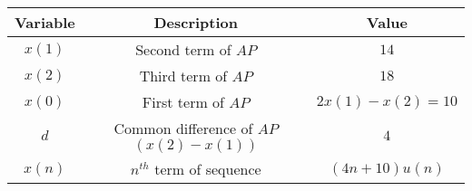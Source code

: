 \begin{tabular}{|c|c|c|} 
      \hline
\textbf{Variable}& \textbf{Description}& \textbf{Value}\\\hline
        $x(1)$& Second term of $AP$ & $14$ \\ \hline
        $x(2)$ &Third term of $AP$ & $18$ \\ \hline
         $x(0)$ & First term of $AP$ & $2x(1)-x(2)=10$ \\ \hline
         $d$ & Common difference of $AP$ $(x(2)-x(1))$ & $4$ \\ \hline
          $x(n)$& $n^{th}$ term of sequence& $(4n+10)u(n)$\\ \hline 
          
    \end{tabular}
